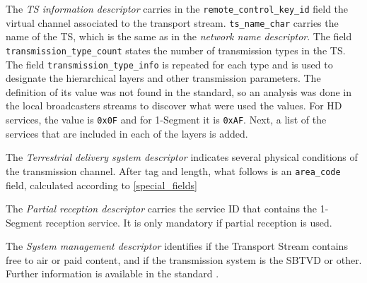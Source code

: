 \documentclass[
	12pt,				%
	openright,			%
	twoside,			%
	a4paper,			%
	brazil,
	french,				%
	english
	]{abntex2}
\begin{document}
The \textit{TS information descriptor} carries in the \texttt{remote\hspace{0.1mm}\_\hspace{0.1mm}control\hspace{0.1mm}\_\hspace{0.1mm}key\hspace{0.1mm}\_\hspace{0.1mm}id} field the virtual channel associated to the transport stream. \texttt{ts\hspace{0.1mm}\_\hspace{0.1mm}name\hspace{0.1mm}\_\hspace{0.1mm}char} carries the name of the TS, which is the same as in the \textit{network name descriptor}. The field \texttt{transmission\hspace{0.1mm}\_\hspace{0.1mm}type\hspace{0.1mm}\_\hspace{0.1mm}count} states the number of transmission types in the TS. The field \texttt{transmission\hspace{0.1mm}\_\hspace{0.1mm}type\hspace{0.1mm}\_\hspace{0.1mm}info} is repeated for each type and is used to designate the hierarchical layers and other transmission parameters. The definition of its value was not found in the standard, so an analysis was done in the local broadcasters streams to discover what were used the values. For HD services, the value is \texttt{0x0F} and for 1-Segment it is \texttt{0xAF}. Next, a list of the services that are included in each of the layers is added.

The \textit{Terrestrial delivery system descriptor} indicates several physical conditions of the transmission channel. After tag and length, what follows is an \texttt{area\hspace{0.1mm}\_\hspace{0.1mm}code} field, calculated according to \autoref{special_fields} 

The \textit{Partial reception descriptor} carries the service ID that contains the 1-Segment reception service. It is only mandatory if partial reception is used.

The \textit{System management descriptor} identifies if the Transport Stream contains free to air or paid content, and if the transmission system is the SBTVD or other. Further information is available in the standard .
\end{document}
